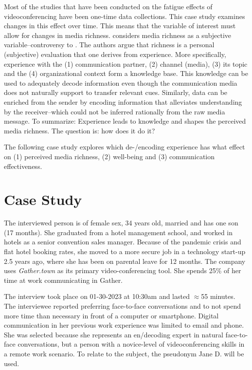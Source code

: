 \documentclass[man]{apa7}
\begin{document}
Most of the studies that have been conducted on the fatigue effects of videoconferencing have been one-time data collections. This case study examines changes in this effect over time. This means that the variable of interest must allow for changes in media richness. \cite{Carlson1999} considers media richness as a subjective variable–controversy to \citeauthor{daft1983information}. The authors argue that richness is a personal (subjective) evaluation that one derives from experience. More specifically, experience with the (1) communication partner, (2) channel (media), (3) its topic and the (4) organizational context form a knowledge base. This knowledge can be used to adequately decode information even though the communication media does not naturally support to transfer relevant cues. Similarly, data can be enriched from the sender by encoding information that alleviates understanding by the receiver–which could not be inferred rationally from the raw media message. To summarize: Experience leads to knowledge and shapes the perceived media richness. The question is: how does it do it?

The following case study explores which de-/encoding experience has what effect on (1) perceived media richness, (2) well-being and (3) communication effectiveness.

\section{Case Study}

The interviewed person is of female sex, 34 years old, married and has one son (17 months). She graduated from a hotel management school, and worked in hotels as a senior convention sales manager. Because of the pandemic crisis and flat hotel booking rates, she moved to a more secure job in a technology start-up 2.5 years ago, where she has been on parental leave for 12 months. The company uses \textit{Gather.town} as its primary video-conferencing tool. She spends 25\% of her time at work communicating in Gather.

The interview took place on 01-30-2023 at 10:30am and lasted $\approx$55 minutes. The interviewee reported preferring face-to-face conversations and to not spend more time than necessary in front of a computer or smartphone. Digital communication in her previous work experience was limited to email and phone. She was selected because she represents an en/decoding expert in natural face-to-face conversations, but a person with a novice-level of videoconferencing skills in a remote work scenario. To relate to the subject, the pseudonym Jane D. will be used.
\end{document}
